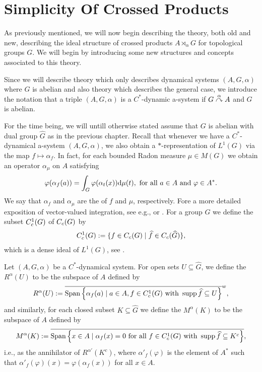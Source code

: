 \chapter{Simplicity Of Crossed Products}
As previously mentioned, we will now begin describing the theory, both old and new, describing the ideal structure of crossed products $A \rtimes_\alpha G$ for topological groups $G$. We will begin by introducing some new structures and concepts associated to this theory.

Since we will describe theory which only describes dynamical systems $(A,G,\alpha)$ where $G$ is abelian and also theory which describes the general case, we introduce the notation that a triple $(A, G, \alpha)$ is a $C^*$-dynamic a-system if $G \stackrel{\alpha}{\curvearrowright} A$ and $G$ is abelian. 

For the time being, we will untill otherwise stated assume that $G$ is abelian with dual group $\hat G$ as in the previous chapter. Recall that whenever we have a $C^*$-dynamical a-system $(A, G, \alpha)$, we also obtain a $*$-representation of $L^1(G)$ via the map $f \mapsto \alpha_f$. In fact, for each bounded Radon measure $\mu \in M(G)$ we obtain an operator $\alpha_\mu$ on $A$ satisfying
\begin{align*}
	\varphi(\alpha_f(a)) = \int_G \varphi(\alpha_t(x)) \mathrm{d} \mu(t), \text{ for all } a \in A \text{ and } \varphi \in A^*.
\end{align*}
We say that $\alpha_f$ and $\alpha_\mu$ are the  of $f$ and $\mu$, respectively. Fore a more detailed exposition of vector-valued integration, see e.g., \cite[Appendix 3, Lemma 7.4.4]{pedersenalgauto} or \cite[Appendix A.3]{folland2016fourier}. For a group $G$ we define the subset $C_c^1(G)$ of $C_c(G)$ by
\begin{align*}
	C_c^1(G):= \{ f \in C_c(G) \mid \widehat{f} \in C_c(\widehat{G})\},
\end{align*}
which is a dense ideal of $L^1(G)$, see \cite[Theorem 4.60]{folland2016fourier}.
\begin{definition}
	Let $(A, G, \alpha)$ be a $C^*$-dynamical system. For open sets $U \subseteq \hat G$, we define the  $R^\alpha(U)$ to be the subspace of $A$ defined by
	\begin{align*}
		R^\alpha(U) := \overline{ \mathrm{Span} \left\{ \alpha_f(a) \mid a \in A, f \in C_c^1(G) \text{ with } \operatorname{supp} \widehat{f} \subseteq U \right\} }^{w},
	\end{align*}
	and similarly, for each closed subset $K \subseteq \hat G$ we define the  $M^\alpha(K)$ to be the subspace of $A$ defined by
	\begin{align*}
		M^\alpha(K) := \overline{\mathrm{Span} \left\{ x \in A \mid \alpha_f(x) = 0 \text{ for all } f \in C_c^1(G) \text{ with } \operatorname{supp} \widehat{f} \subseteq K^c \right\}},
	\end{align*}
	i.e., as the annihilator of $R^{\alpha'}(K^c)$, where $\alpha'_f(\varphi)$ is the element of $A^*$ such that $\alpha'_f(\varphi)(x)=\varphi(\alpha_f(x))$ for all $x \in A$.
\end{definition}
